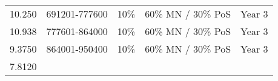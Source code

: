 \documentclass[11pt,a4paperpaper,]{report}
\begin{document}
\begin{longtable}[]{@{}llccc@{}}
\begin{minipage}[t]{0.12\columnwidth}
10.250\strut
\end{minipage} & \begin{minipage}[t]{0.19\columnwidth}\raggedright\strut
691201-777600\strut
\end{minipage} & \begin{minipage}[t]{0.14\columnwidth}\centering\strut
10\%\strut
\end{minipage} & \begin{minipage}[t]{0.24\columnwidth}\centering\strut
60\% MN / 30\% PoS\strut
\end{minipage} & \begin{minipage}[t]{0.12\columnwidth}\centering\strut
Year 3\strut
\end{minipage}\tabularnewline
\begin{minipage}[t]{0.12\columnwidth}\raggedright\strut
10.938\strut
\end{minipage} & \begin{minipage}[t]{0.19\columnwidth}\raggedright\strut
777601-864000\strut
\end{minipage} & \begin{minipage}[t]{0.14\columnwidth}\centering\strut
10\%\strut
\end{minipage} & \begin{minipage}[t]{0.24\columnwidth}\centering\strut
60\% MN / 30\% PoS\strut
\end{minipage} & \begin{minipage}[t]{0.12\columnwidth}\centering\strut
Year 3\strut
\end{minipage}\tabularnewline
\begin{minipage}[t]{0.12\columnwidth}\raggedright\strut
9.3750\strut
\end{minipage} & \begin{minipage}[t]{0.19\columnwidth}\raggedright\strut
864001-950400\strut
\end{minipage} & \begin{minipage}[t]{0.14\columnwidth}\centering\strut
10\%\strut
\end{minipage} & \begin{minipage}[t]{0.24\columnwidth}\centering\strut
60\% MN / 30\% PoS\strut
\end{minipage} & \begin{minipage}[t]{0.12\columnwidth}\centering\strut
Year 3\strut
\end{minipage}\tabularnewline
\begin{minipage}[t]{0.12\columnwidth}\raggedright\strut
7.8120\strut
\end{minipage} & \begin{minipage}[t]{0.19\columnwidth}\raggedright\strut

\end{minipage}
\end{longtable}
\end{document}
